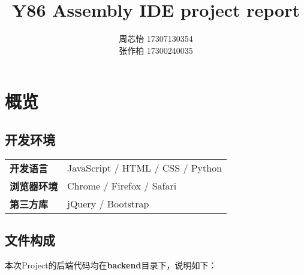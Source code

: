 \documentclass[12pt]{article} %
\title{\textbf{Y86 Assembly IDE project report}}
\author{周芯怡 17307130354\\张作柏 17300240035}
\begin{document}
\begin{sloppypar}
\maketitle

\pagestyle{fancy}
\lhead{\textbf{{\thetitle}}}
\rhead{\textbf{\nouppercase{\firstleftmark}}}
\cfoot{\thepage}

\tableofcontents
\clearpage



\section{概览}

\subsection{开发环境}

\begin{table}[h]
\begin{tabular}{ll}
{\bf 开发语言}   & JavaScript / HTML / CSS / Python  \\
{\bf 浏览器环境} & Chrome / Firefox / Safari \\
{\bf 第三方库}   & jQuery / Bootstrap                             
\end{tabular}
\end{table}

\subsection{文件构成}

\noindent
本次Project的后端代码均在{\bf backend}目录下，说明如下：



\end{sloppypar}
\end{document}
